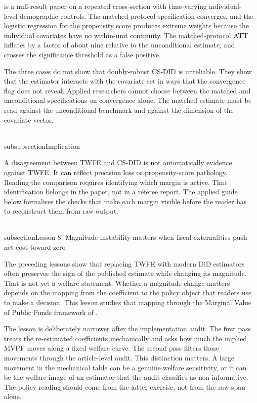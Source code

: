\documentclass[11pt]{article}
\begin{document}
\textcite{levine2011effective} is a null-result paper on a repeated cross-section with time-varying individual-level demographic controls. The matched-protocol specification converges, and the logistic regression for the propensity score produces extreme weights because the individual covariates have no within-unit continuity. The matched-protocol ATT inflates by a factor of about nine relative to the unconditional estimate, and crosses the significance threshold as a false positive.

The three cases do not show that doubly-robust CS-DID is unreliable. They show that the estimator interacts with the covariate set in ways that the convergence flag does not reveal. Applied researchers cannot choose between the matched and unconditional specifications on convergence alone. The matched estimate must be read against the unconditional benchmark and against the dimension of the covariate vector.

\\subsubsection{Implication}

A disagreement between TWFE and CS-DID is not automatically evidence against TWFE. It can reflect precision loss or propensity-score pathology. Reading the comparison requires identifying which margin is active. That identification belongs in the paper, not in a referee report. The applied guide below formalises the checks that make each margin visible before the reader has to reconstruct them from raw output.







\newpage
\\subsection{Lesson 8. Magnitude instability matters when fiscal externalities push net cost toward zero}
\label{sec:mvpf_stress_test}

The preceding lessons show that replacing TWFE with modern DiD estimators often preserves the sign of the published estimate while changing its magnitude. That is not yet a welfare statement. Whether a magnitude change matters depends on the mapping from the coefficient to the policy object that readers use to make a decision. This lesson studies that mapping through the Marginal Value of Public Funds framework of \textcite{hendren2020unified}.

The lesson is deliberately narrower after the implementation audit. The first pass treats the re-estimated coefficients mechanically and asks how much the implied MVPF moves along a fixed welfare curve. The second pass filters those movements through the article-level audit. This distinction matters. A large movement in the mechanical table can be a genuine welfare sensitivity, or it can be the welfare image of an estimator that the audit classifies as non-informative. The policy reading should come from the latter exercise, not from the raw span alone.
\end{document}
